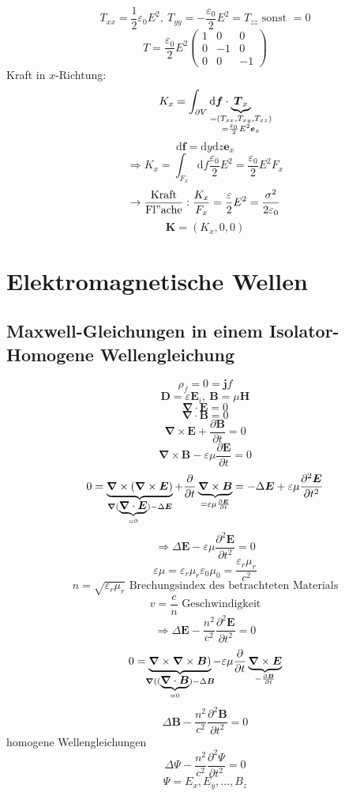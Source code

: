 \documentclass[titlepage,11pt,a4paper,ngerman]{report}
\newcommand{\tx}[1]{\textrm{#1}}
\newcommand{\dd}{\tx{d}}
\newcommand{\vpsi}{\varPsi}
\renewcommand{\vec}[1]{\boldsymbol{#1}}
\renewcommand{\epsilon}{\varepsilon}
\newcommand{\vabla}{\boldsymbol{\nabla}}
\begin{document}
\begin{enumerate}[i)]
\[T_{xx}=\frac{1}{2}\epsilon_0E^2,\ T_{yy}=-\frac{\epsilon_0}{2}E^2=T_{zz}\textrm{ sonst }=0\]
\[T=\frac{\epsilon_0}{2}E^2\begin{pmatrix}1&0&0\\0&-1&0\\0&0&-1\end{pmatrix}\]
Kraft in $x$-Richtung:
\[K_x=\int_{\partial V}\dd\vec{f}\cdot\underbrace{\vec{T}_x}_{\mathclap{\substack{=(T_{xx},T_{xy},T_{xz})\\=\frac{\epsilon_0}{2}E^2\vec{e}_x}}}\]
\[\dd\vec{f}=\dd y\dd z\vec{e}_x\]
\[\Rightarrow K_x=\int_{F_x}\dd f\frac{\epsilon_0}{2}E^2=\frac{\epsilon_0}{2}E^2F_x\]
\[\rightarrow\mathrm{\frac{Kraft}{Fl"ache}}:\frac{K_x}{F_x}=\frac{\epsilon}{2}E^2=\frac{\sigma^2}{2\epsilon_0}\]
\[\vec{K}=(K_x,0,0)\]
\end{enumerate} 
\section{Elektromagnetische Wellen}
\subsection{Maxwell-Gleichungen in einem Isolator-Homogene Wellengleichung}
\[\rho_f=0=\vec{j}f\]
\[\vec{D}=\epsilon\vec{E}_i,\ \vec{B}=\mu\vec{H}\]
\[\vabla\cdot\vec{E}=0\]
\[\vabla\cdot\vec{B}=0\]
\[\vabla\times\vec{E}+\frac{\partial\vec{B}}{\partial t}=0\]
\[\vabla\times\vec{B}-\epsilon\mu\frac{\partial\vec{E}}{\partial t}=0\]
\[0=\underbrace{\vabla\times(\vabla\times\vec{E})}_{\mathclap{\vabla(\underbrace{\vabla\cdot\vec{E}}_{=0})-\Delta\vec{E}}}+\frac{\partial}{\partial t}\underbrace{\vabla\times\vec{B}}_{=\epsilon\mu\frac{\partial\vec{E}}{\partial t}}=-\Delta\vec{E}+\epsilon\mu\frac{\partial^2\vec{E}}{\partial t^2}\]
\[\Rightarrow\Delta\vec{E}-\epsilon\mu\frac{\partial^2\vec{E}}{\partial t^2}=0\]
\[\epsilon\mu=\epsilon_r\mu_r\epsilon_0\mu_0=\frac{\epsilon_r\mu_r}{c^2}\]
\[n=\sqrt{\epsilon_r\mu_r}\textrm{ Brechungsindex des betrachteten Materials}\]
\[v=\frac{c}{n}\textrm{ Geschwindigkeit}\]
\[\Rightarrow\Delta\vec{E}-\frac{n^2}{c^2}\frac{\partial^2\vec{E}}{\partial t^2}=0\]
\[0=\underbrace{\vabla\times\vabla\times\vec{B})}_{\mathclap{\vabla((\underbrace{\vabla\cdot\vec{B}}_{=0})-\Delta\vec{B}}}-\epsilon\mu\frac{\partial}{\partial t}\underbrace{\vabla\times\vec{E}}_{-\frac{\partial\vec{B}}{\partial t}}\]
\[\Delta\vec{B}-\frac{n^2}{c^2}\frac{\partial^2\vec{B}}{\partial t^2}=0\]
homogene Wellengleichungen
\[\Delta\vpsi-\frac{n^2}{c^2}\frac{\partial^2\vpsi}{\partial t^2}=0\]
\[\vpsi=E_x,E_y,\ldots,B_z\]
\end{document}
